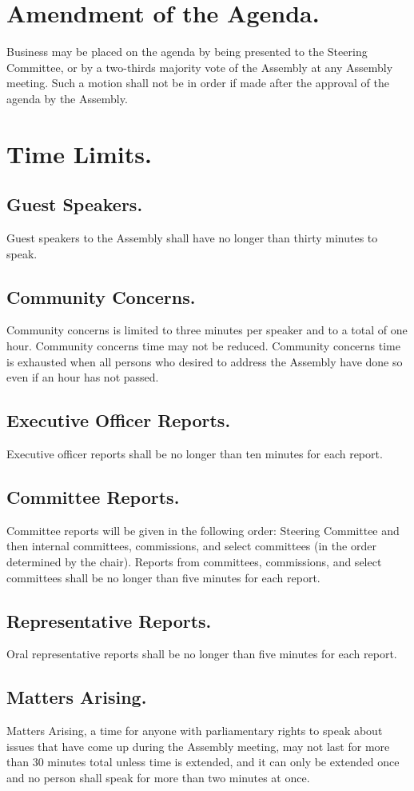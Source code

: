 \documentclass{rules}
\begin{document}
\section{Amendment of the Agenda.}
Business may be placed on the agenda by being presented to the Steering Committee, or by a two-thirds majority vote of the Assembly at any Assembly meeting.  Such a motion shall not be in order if made after the approval of the agenda by the Assembly.

\section{Time Limits.}
\subsection{Guest Speakers.}
Guest speakers to the Assembly shall have no longer than thirty minutes to speak.
\subsection{Community Concerns.}
Community concerns is limited to three minutes per speaker and to a total of one hour. Community concerns time may not be reduced.  Community concerns time is exhausted when all persons who desired to address the Assembly have done so even if an hour has not passed.
\subsection{Executive Officer Reports.}
Executive officer reports shall be no longer than ten minutes for each report.
\subsection{Committee Reports.}
Committee reports will be given in the following order: Steering Committee and then internal committees, commissions, and select committees (in the order determined by the chair).  Reports from committees, commissions, and select committees shall be no longer than five minutes for each report.
\subsection{Representative Reports.}
Oral representative reports shall be no longer than five minutes for each report.
\subsection{Matters Arising.}
Matters Arising, a time for anyone with parliamentary rights to speak about issues that have come up during the Assembly meeting, may not last for more than 30 minutes total unless time is extended, and it can only be extended once and no person shall speak for more than two minutes at once.
\end{document}
